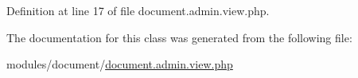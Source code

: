 Definition at line 17 of file document.\+admin.\+view.\+php.



The documentation for this class was generated from the following file\+:\begin{DoxyCompactItemize}
\item 
modules/document/\hyperlink{document_8admin_8view_8php}{document.\+admin.\+view.\+php}\end{DoxyCompactItemize}
